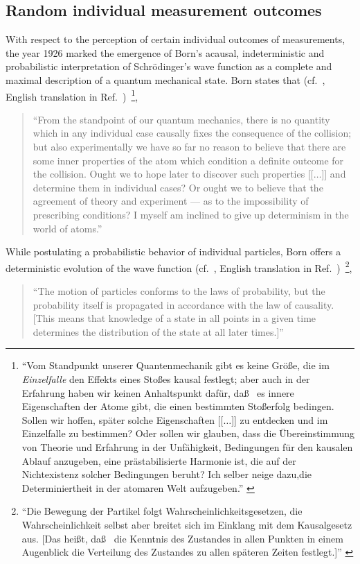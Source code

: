 \documentclass[10pt]{article}%
\begin{document}
\subsection{Random individual measurement outcomes}

With respect to the perception of certain individual outcomes of measurements,
the year 1926 marked the emergence of Born's acausal, indeterministic and
probabilistic interpretation of
Schr\"odinger's wave function as a complete and maximal description of a quantum mechanical state.
Born states that (cf.~\cite[p.~866]{born-26-1}, English translation in Ref.~\cite[p.~54]{wheeler-Zurek:83})~\footnote{
{ ``Vom Standpunkt unserer Quantenmechanik gibt es keine Gr\"o\ss e, die im {\em Einzelfalle} den Effekts eines Sto\ss es
kausal festlegt; aber auch in der Erfahrung haben wir keinen Anhaltspunkt daf\"ur, da\ss~ es innere Eigenschaften
der Atome gibt, die einen bestimmten Sto\ss erfolg bedingen.
Sollen wir hoffen, sp\"ater solche Eigenschaften
[[$\ldots$]] zu entdecken und im Einzelfalle zu bestimmen?
Oder sollen wir glauben, dass die \"Ubereinstimmung von Theorie und Erfahrung
in der Unf\"ahigkeit, Bedingungen f\"ur den kausalen Ablauf anzugeben, eine pr\"astabilisierte Harmonie ist,
die auf der Nichtexistenz solcher Bedingungen beruht?
Ich selber neige dazu,die Determiniertheit in der atomaren Welt aufzugeben.''
}
},
\begin{quote}
{  ``From the standpoint of our quantum mechanics, there is no quantity
which in any individual case causally fixes the consequence of the collision;
but also experimentally we have so far no reason to believe that there are some inner properties of the atom
which condition a definite outcome for the collision.
Ought we to hope later to discover such properties [[$\ldots$]]  and determine them in individual cases?
Or ought we to believe that the agreement of theory and experiment --- as to the impossibility
of prescribing conditions? I myself am inclined to give up determinism in the world of atoms.''
}
\end{quote}
While postulating a probabilistic behavior of individual particles,
Born offers a deterministic evolution of the wave function
(cf.~\cite[p.~804]{born-26-2}, English translation in Ref.~\cite[p.~302]{jammer:89})~\footnote{
{  ``Die Bewegung der Partikel folgt Wahrscheinlichkeitsgesetzen,
die Wahrscheinlichkeit selbst aber breitet sich im Einklang mit dem Kausalgesetz  aus.
[Das hei\ss t, da\ss~ die Kenntnis des Zustandes in allen Punkten in einem Augenblick
die Verteilung des Zustandes zu allen sp{\"a}teren Zeiten festlegt.]''
}
},
\begin{quote}
{  ``The motion of particles conforms to the laws of probability, but the probability itself
is propagated in accordance with the law of causality.
[This means that knowledge of a state in all points in a given time determines the distribution of
the state at all later times.]''
}
\end{quote}
\end{document}
